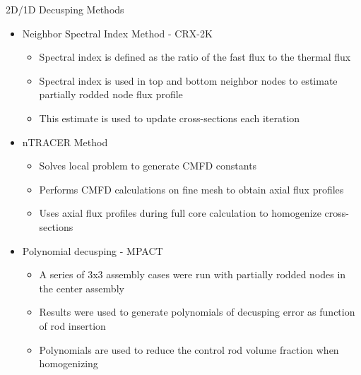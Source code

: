 \begin{frame}[t]{2D/1D Decusping Methods}
    
    \begin{itemize}
        \item Neighbor Spectral Index Method - CRX-2K 
        \cite{cho2015CRX2d1dFusionDecusping}
        \begin{itemize}
          \item Spectral index is defined as the ratio of the fast flux to the 
          thermal flux
          \item Spectral index is used in top and bottom neighbor nodes to 
          estimate partially rodded node flux profile
          \item This estimate is used to update cross-sections 
          each iteration
        \end{itemize}
        \item nTRACER Method \cite{ICAPPcontrolRodDecuspingNTRACER}
        \begin{itemize}
          \item Solves local problem to generate CMFD constants
          \item Performs CMFD calculations on fine mesh to obtain axial flux 
          profiles
          \item Uses axial flux profiles during full core calculation to 
          homogenize cross-sections
        \end{itemize}
        \item Polynomial decusping - MPACT \cite{MC2015_VCS_Cycle_Depletion}
        \begin{itemize}
          \item A series of 3x3 assembly cases were run with partially rodded 
          nodes in the center assembly
          \item Results were used to generate polynomials of decusping error as 
          function of rod insertion
          \item Polynomials are used to reduce the control rod volume fraction 
          when homogenizing
        \end{itemize}
    \end{itemize}
    
\end{frame}


